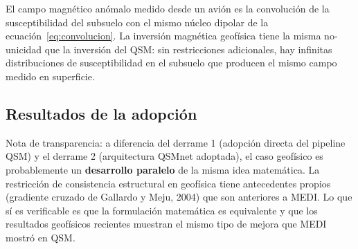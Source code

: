 \documentclass[12pt, a4paper]{article}
\begin{document}
El campo magnético anómalo medido desde un avión es la convolución de la susceptibilidad del subsuelo con el mismo núcleo dipolar de la ecuación~\eqref{eq:convolucion}. La inversión magnética geofísica tiene la misma no-unicidad que la inversión del QSM: sin restricciones adicionales, hay infinitas distribuciones de susceptibilidad en el subsuelo que producen el mismo campo medido en superficie.

\subsection{Resultados de la adopción}

Nota de transparencia: a diferencia del derrame 1 (adopción directa del pipeline QSM) y el derrame 2 (arquitectura QSMnet adoptada), el caso geofísico es probablemente un \textbf{desarrollo paralelo} de la misma idea matemática. La restricción de consistencia estructural en geofísica tiene antecedentes propios (gradiente cruzado de Gallardo y Meju, 2004) que son anteriores a MEDI. Lo que sí es verificable es que la formulación matemática es equivalente y que los resultados geofísicos recientes muestran el mismo tipo de mejora que MEDI mostró en QSM.
\end{document}
